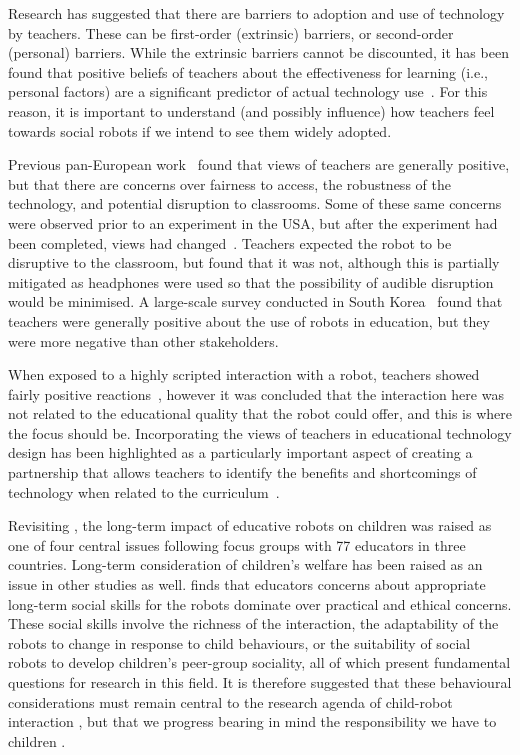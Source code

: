 Research has suggested that there are barriers to adoption and use of technology by teachers. These can be first-order (extrinsic) barriers, or second-order (personal) barriers. While the extrinsic barriers cannot be discounted, it has been found that positive beliefs of teachers about the effectiveness for \gls{learning} (i.e., personal factors) are a significant predictor of actual technology use~\citep{blackwell2013adoption}. For this reason, it is important to understand (and possibly influence) how teachers feel towards social robots if we intend to see them widely adopted.

Previous pan-European work~\citep{serholt2014teachers} found that views of teachers are generally positive, but that there are concerns over fairness to access, the robustness of the technology, and potential disruption to classrooms. Some of these same concerns were observed prior to an experiment in the USA, but after the experiment had been completed, views had changed~\citep{kory2016lessons}. Teachers expected the robot to be disruptive to the classroom, but found that it was not, although this is partially mitigated as headphones were used so that the possibility of audible disruption would be minimised. A large-scale survey conducted in South Korea~\citep{lee2008elementary} found that teachers were generally positive about the use of robots in education, but they were more negative than other stakeholders.

When exposed to a highly scripted interaction with a robot, teachers showed fairly positive reactions~\citep{fridin2014acceptance}, however it was concluded that the interaction here was not related to the educational quality that the robot could offer, and this is where the focus should be. Incorporating the views of teachers in educational technology design has been highlighted as a particularly important aspect of creating a partnership that allows teachers to identify the benefits and shortcomings of technology when related to the curriculum~\citep{okita2011current}. 

Revisiting \citet{serholt2016classroom}, the long-term impact of educative robots on children was raised as one of four central issues following focus groups with 77 educators in three countries. Long-term consideration of children's welfare has been raised as an issue in other studies as well. \citet{kennedy2016cautious} finds that educators concerns about appropriate long-term social skills for the robots dominate over practical and ethical concerns. These social skills involve the richness of the interaction, the adaptability of the robots to change in response to child behaviours, or the suitability of social robots to develop children's peer-group sociality, all of which present fundamental questions for research in this field. It is therefore suggested that these behavioural considerations must remain central to the research agenda of child-robot interaction \citep{kennedy2016cautious}, but that we progress bearing in mind the responsibility we have to children \citep{serholt2016classroom}.

